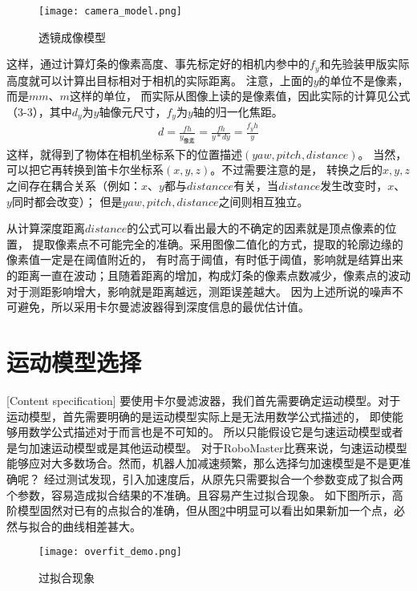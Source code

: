 \begin{figure}[H]
    \centering
    \texttt{[image: camera\_model.png]} 
    \caption{透镜成像模型}
    \label{透镜成像模型} 
\end{figure}    
这样，通过计算灯条的像素高度、事先标定好的相机内参中的$f_y$和先验装甲版实际高度就可以计算出目标相对于相机的实际距离。
注意，上面的$y$的单位不是像素，而是$mm$、$m$这样的单位，
而实际从图像上读的是像素值，因此实际的计算见公式（3-3），其中$d_y$为$y$轴像元尺寸，$f_y$为$y$轴的归一化焦距。
\begin{gather}
    d=\frac{fh}{y_{像素}}=\frac{fh}{y*dy}=\frac{f_yh}{y}
\end{gather}
这样，就得到了物体在相机坐标系下的位置描述$(yaw,pitch, distance)$。
当然，可以把它再转换到笛卡尔坐标系$(x,y,z)$。不过需要注意的是，
转换之后的$x,y,z$之间存在耦合关系（例如：$x$、$y$都与$distancce$有关，当$distance$发生改变时，$x$、$y$同时都会改变）；
但是$yaw,pitch,distance$之间则相互独立。\par

从计算深度距离$distance$的公式可以看出最大的不确定的因素就是顶点像素的位置，
提取像素点不可能完全的准确。采用图像二值化的方式，提取的轮廓边缘的像素值一定是在阈值附近的，
有时高于阈值，有时低于阈值，影响就是结算出来的距离一直在波动；且随着距离的增加，构成灯条的像素点数减少，像素点的波动对于测距影响增大，影响就是距离越远，测距误差越大。
因为上述所说的噪声不可避免，所以采用卡尔曼滤波器得到深度信息的最优估计值。\par

\section{运动模型选择}[Content specification]
要使用卡尔曼滤波器，我们首先需要确定运动模型。对于运动模型，首先需要明确的是运动模型实际上是无法用数学公式描述的，
即使能够用数学公式描述对于而言也是不可知的。 所以只能假设它是匀速运动模型或者是匀加速运动模型或是其他运动模型。
对于RoboMaster比赛来说，匀速运动模型能够应对大多数场合。然而，机器人加减速频繁，那么选择匀加速模型是不是更准确呢？ 
经过测试发现，引入加速度后，从原先只需要拟合一个参数变成了拟合两个参数，容易造成拟合结果的不准确。且容易产生过拟合现象。
如下图所示，高阶模型固然对已有的点拟合的准确，但从图\ref{过拟合现象}中明显可以看出如果新加一个点，必然与拟合的曲线相差甚大。
\begin{figure}[H]
    \centering
    \texttt{[image: overfit\_demo.png]} 
    \caption{过拟合现象} 
    \label{过拟合现象} 
\end{figure} 

